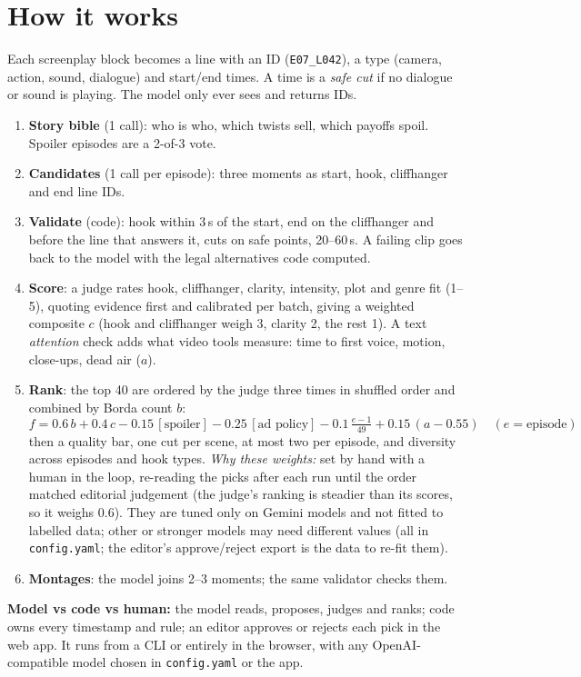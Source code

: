 \documentclass[10pt]{article}
\begin{document}
\section{How it works}
Each screenplay block becomes a line with an ID (\texttt{E07\_L042}), a type (camera, action, sound, dialogue) and
start/end times. A time is a \emph{safe cut} if no dialogue or sound is playing. The model only ever sees and returns IDs.
\begin{enumerate}
\item \textbf{Story bible} (1 call): who is who, which twists sell, which payoffs spoil. Spoiler episodes are a 2-of-3 vote.
\item \textbf{Candidates} (1 call per episode): three moments as start, hook, cliffhanger and end line IDs.
\item \textbf{Validate} (code): hook within 3\,s of the start, end on the cliffhanger and before the line that answers it,
cuts on safe points, 20--60\,s. A failing clip goes back to the model with the legal alternatives code computed.
\item \textbf{Score}: a judge rates hook, cliffhanger, clarity, intensity, plot and genre fit (1--5), quoting evidence
first and calibrated per batch, giving a weighted composite $c$ (hook and cliffhanger weigh 3, clarity 2, the rest 1).
A text \emph{attention} check adds what video tools measure: time to first voice, motion, close-ups, dead air ($a$).
\item \textbf{Rank}: the top 40 are ordered by the judge three times in shuffled order and combined by Borda count $b$:
\[ f = 0.6\,b + 0.4\,c - 0.15\,[\text{spoiler}] - 0.25\,[\text{ad policy}] - 0.1\,\tfrac{e-1}{49} + 0.15\,(a-0.55) \quad (e=\text{episode}) \]
then a quality bar, one cut per scene, at most two per episode, and diversity across episodes and hook types.
\emph{Why these weights:} set by hand with a human in the loop, re-reading the picks after each run until the order
matched editorial judgement (the judge's ranking is steadier than its scores, so it weighs 0.6). They are tuned only on
Gemini models and not fitted to labelled data; other or stronger models may need different values (all in
\texttt{config.yaml}; the editor's approve/reject export is the data to re-fit them).
\item \textbf{Montages}: the model joins 2--3 moments; the same validator checks them.
\end{enumerate}
\textbf{Model vs code vs human:} the model reads, proposes, judges and ranks; code owns every timestamp and rule; an
editor approves or rejects each pick in the web app. It runs from a CLI or entirely in the browser, with any
OpenAI-compatible model chosen in \texttt{config.yaml} or the app.
\end{document}
